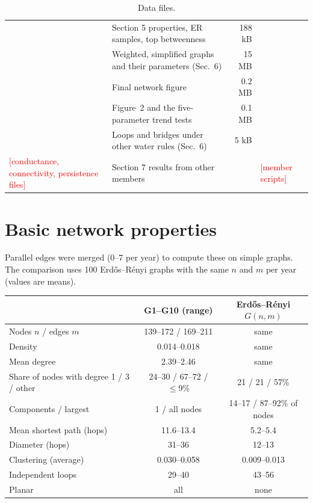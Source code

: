 \documentclass[11pt,a4paper]{article}
\newcommand{\todo}[1]{\textcolor{red}{[#1]}}
\begin{document}
\begin{table}[H]
\begin{tabularx}{\textwidth}{@{}p{5.0cm}Lrp{3.6cm}@{}}
 & Section 5 properties, ER samples, top betweenness & 188 kB &  \\
 & Weighted, simplified graphs and their parameters (Sec.~6) & 15 MB &  \\
 & Final network figure & 0.2 MB &  \\
\newline{} & Figure~2 and the five-parameter trend tests & 0.1 MB &  \\
\newline{} & Loops and bridges under other water rules (Sec.~6) & 5 kB &  \\
\todo{conductance, connectivity, persistence files} & Section 7 results from other members & & \todo{member scripts} \\
\bottomrule
\end{tabularx}
\caption{Data files.}\label{tab:files}
\end{table}

\section{Basic network properties}

Parallel edges were merged (0--7 per year) to compute these on simple graphs. The comparison uses 100 Erdős–Rényi graphs with the same $n$ and $m$ per year (values are means).

\begin{table}[H]
\centering\small
\begin{tabular}{@{}p{5.2cm}cc@{}}
\toprule
 & G1--G10 (range) & Erdős–Rényi $G(n,m)$ \cite{er1959} \\
\midrule
Nodes $n$ / edges $m$ & 139--172 / 169--211 & same \\
Density & 0.014--0.018 & same \\
Mean degree & 2.39--2.46 & same \\
Share of nodes with degree 1 / 3 / other & 24--30 / 67--72 / $\le$9\% & 21 / 21 / 57\% \\
Components / largest & 1 / all nodes & 14--17 / 87--92\% of nodes \\
Mean shortest path (hops) & 11.6--13.4 & 5.2--5.4 \\
Diameter (hops) & 31--36 & 12--13 \\
Clustering (average) & 0.030--0.058 & 0.009--0.013 \\
Independent loops & 29--40 & 43--56 \\
Planar & all & none \\
\bottomrule
\end{tabular}
\end{table}
\end{document}
